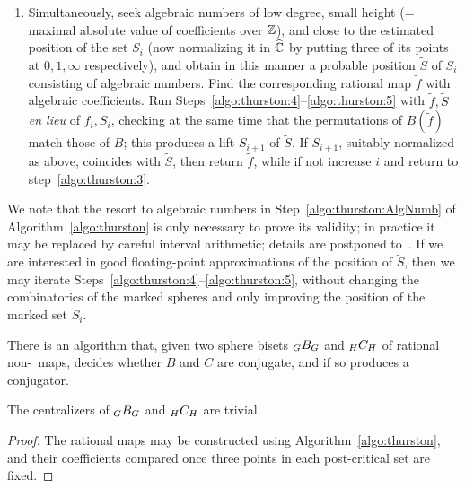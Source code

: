 \documentclass{amsart}
\begin{document}
\begin{algo}
\begin{enumerate}
    To detect this, compute all cross-ratios of points in
    $S_i$. Partition the points in $S_i$ by clustering together points
    with degenerating cross-ratios. Produce conjugacy classes in $G$
    by following labels on dual edges in the triangulation around
    clusters. Complete these conjugacy classes by adding their
    $B_*$-preimages till the collection becomes either $B$-invariant
    or non-(non-crossing). If it became invariant, compute its
    transition matrix to check whether it is an annular
    obstruction. In that case, return the annular obstruction.

  \item Simultaneously, seek algebraic numbers of low degree, small
    height (= maximal absolute value of coefficients over ${\mathbb Z}$), and
    close to the estimated position of the set $S_i$ (now normalizing
    it in $\widehat{{\mathbb C}}$ by putting three of its points at $0,1,\infty$
    respectively), and obtain in this manner a probable position
    $\tilde S$ of $S_i$ consisting of algebraic numbers. Find the
    corresponding rational map $\tilde f$ with algebraic
    coefficients. Run
    Steps~\eqref{algo:thurston:4}--\eqref{algo:thurston:5} with
    $\tilde f,\tilde S$ \emph{en lieu} of $f_i,S_i$, checking at the
    same time that the permutations of $B(\tilde f)$ match those of
    $B$; this produces a lift $S_{i+1}$ of $\tilde S$. If $S_{i+1}$,
    suitably normalized as above, coincides with $\tilde S$, then
    return $\tilde f$, while if not increase $i$ and return to
    step~\eqref{algo:thurston:3}.\label{algo:thurston:AlgNumb}
  \end{enumerate}
\end{algo}
We note that the resort to algebraic numbers in
Step~\eqref{algo:thurston:AlgNumb} of Algorithm~\ref{algo:thurston} is
only necessary to prove its validity; in practice it may be replaced
by careful interval arithmetic; details are postponed
to~\cite{bartholdi-dudko:bc5}. If we are interested in good
floating-point approximations of the position of $\tilde S$, then we
may iterate Steps~\eqref{algo:thurston:4}--\eqref{algo:thurston:5},
without changing the combinatorics of the marked spheres and only
improving the position of the marked set $S_i$.

\begin{cor}\label{cor:conj:RatBis}
  There is an algorithm that, given two sphere bisets
  $\subscript G B_G$ and $\subscript H C_H$ of rational non-\Tor\
  maps, decides whether $B$ and $C$ are conjugate, and if so produces
  a conjugator.

  The centralizers of $\subscript G B_G$ and $\subscript H C_H$
  are trivial.
\end{cor}
\begin{proof}
  The rational maps may be constructed using
  Algorithm~\ref{algo:thurston}, and their coefficients compared once
  three points in each post-critical set are fixed.
\end{proof}
\end{document}
